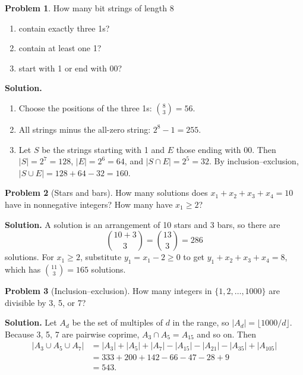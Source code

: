 \documentclass[11pt]{article}
\theoremstyle{definition}
\newtheorem{problem}{Problem}
\begin{document}
\begin{problem}\label{prob:bits}
How many bit strings of length 8
\begin{enumerate}[label=(\alph*)]
  \item contain exactly three 1s?
  \item contain at least one 1?
  \item start with 1 or end with 00?
\end{enumerate}
\end{problem}

\noindent\textbf{Solution.}
\begin{enumerate}[label=(\alph*)]
  \item Choose the positions of the three 1s: $\binom{8}{3} = 56$.
  \item All strings minus the all-zero string: $2^8 - 1 = 255$.
  \item Let $S$ be the strings starting with 1 and $E$ those ending with 00. Then $|S| = 2^7 = 128$, $|E| = 2^6 = 64$, and $|S \cap E| = 2^5 = 32$. By inclusion--exclusion, $|S \cup E| = 128 + 64 - 32 = 160$.
\end{enumerate}

\begin{problem}[Stars and bars]\label{prob:stars}
How many solutions does $x_1 + x_2 + x_3 + x_4 = 10$ have in nonnegative integers? How many have $x_1 \geq 2$?
\end{problem}

\noindent\textbf{Solution.} A solution is an arrangement of 10 stars and 3 bars, so there are
\[
  \binom{10 + 3}{3} = \binom{13}{3} = 286
\]
solutions. For $x_1 \geq 2$, substitute $y_1 = x_1 - 2 \geq 0$ to get $y_1 + x_2 + x_3 + x_4 = 8$, which has $\binom{11}{3} = 165$ solutions.

\begin{problem}[Inclusion--exclusion]\label{prob:incl-excl}
How many integers in $\{1, 2, \dots, 1000\}$ are divisible by 3, 5, or 7?
\end{problem}

\noindent\textbf{Solution.} Let $A_d$ be the set of multiples of $d$ in the range, so $|A_d| = \lfloor 1000/d \rfloor$. Because 3, 5, 7 are pairwise coprime, $A_3 \cap A_5 = A_{15}$ and so on. Then
\begin{align*}
  |A_3 \cup A_5 \cup A_7|
    &= |A_3| + |A_5| + |A_7| - |A_{15}| - |A_{21}| - |A_{35}| + |A_{105}| \\
    &= 333 + 200 + 142 - 66 - 47 - 28 + 9 \\
    &= 543.
\end{align*}
\end{document}
